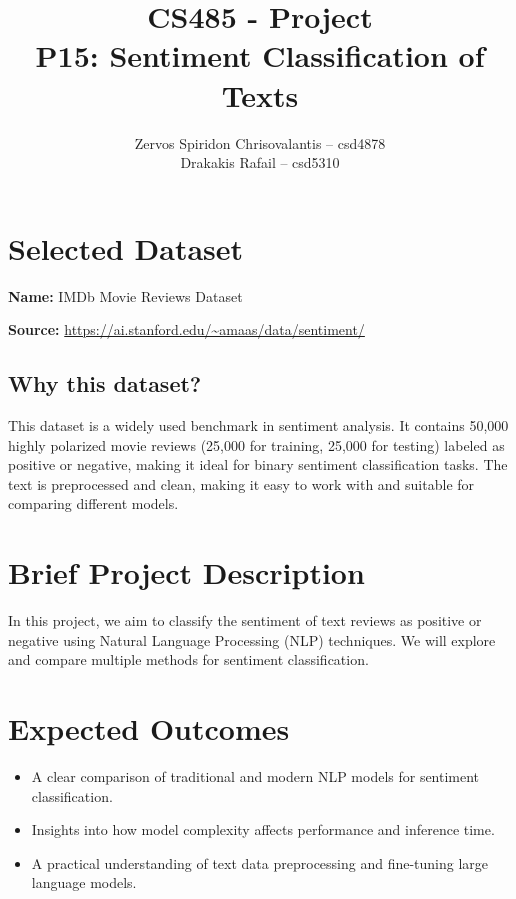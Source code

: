 \documentclass[a4paper,12pt]{article}
\title{CS485 - Project\\
P15: Sentiment Classification of Texts}
\author{
    Zervos Spiridon Chrisovalantis -- csd4878\\
    Drakakis Rafail -- csd5310
}
\date{}
\begin{document}
\maketitle

\section*{Selected Dataset}

\textbf{Name:} IMDb Movie Reviews Dataset

\textbf{Source:} \url{https://ai.stanford.edu/~amaas/data/sentiment/}

\subsection*{Why this dataset?}
This dataset is a widely used benchmark in sentiment analysis. It contains 50,000 highly polarized movie reviews (25,000 for training, 25,000 for testing) labeled as positive or negative, making it ideal for binary sentiment classification tasks. The text is preprocessed and clean, making it easy to work with and suitable for comparing different models.

\section*{Brief Project Description}
In this project, we aim to classify the sentiment of text reviews as positive or negative using Natural Language Processing (NLP) techniques. We will explore and compare multiple methods for sentiment classification.

\section*{Expected Outcomes}
\begin{itemize}
    \item A clear comparison of traditional and modern NLP models for sentiment classification.
    \item Insights into how model complexity affects performance and inference time.
    \item A practical understanding of text data preprocessing and fine-tuning large language models.
\end{itemize}
\end{document}
